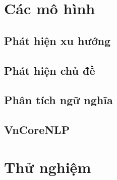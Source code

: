 \documentclass[11pt, a4paper]{article}
\begin{document}
\section{Các mô hình}
\label{sec:models}

\subsection{Phát hiện xu hướng}

\subsection{Phát hiện chủ đề}

\subsection{Phân tích ngữ nghĩa}

\subsection{VnCoreNLP}

\section{Thử nghiệm}
\label{sec:experiments}

\clearpage


\end{document}
